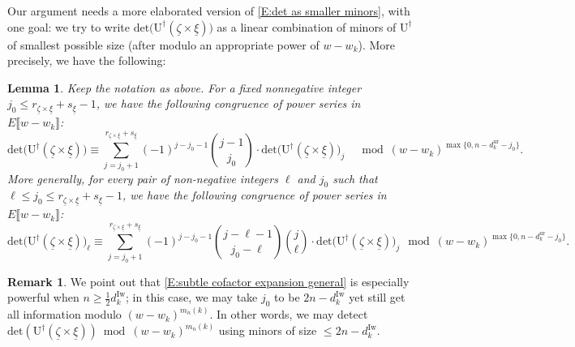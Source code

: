 \documentclass[12pt]{amsart}
\newtheorem{lemma}[subsection]{Lemma}
\theoremstyle{definition}
\newtheorem{remark}[subsection]{Remark}
\numberwithin{equation}{subsection}
\def\rmU{\mathrm{U}}
\newcommand{\Iw}{\mathrm{Iw}}
\renewcommand{\det}{\mathrm{det}}
\newcommand{\ur}{\mathrm{ur}}
\begin{document}
Our argument needs a more elaborated version of \eqref{E:det as smaller minors}, with one goal: we try to write $\det \big( \rmU^\dagger(\underline \zeta \times \underline \xi)\big)$ as a linear combination of minors of $\rmU^\dagger$ of   smallest possible size (after modulo an appropriate power of $w-w_k$). More precisely, we have the following:

\begin{lemma}
\label{L:subtle cofactor expansion}
Keep the notation as above. For a fixed nonnegative integer $j_0\leq r_{\underline \zeta \times \underline \xi} + s_{\underline \xi}-1$, we have the following congruence of power series in $E\llbracket w-w_k\rrbracket$:
\begin{equation}
\label{E:subtle cofactor expansion}
\det \big(\rmU^\dagger(\underline \zeta \times \underline \xi)\big) \equiv \sum_{j= j_0+1}^{r_{\underline \zeta \times \underline \xi} + s_{\underline \xi}} (-1)^{j-j_0-1} \binom{j-1}{j_0}\cdot \det \big(\rmU^\dagger(\underline \zeta \times \underline \xi)\big)_j \quad \bmod (w-w_k)^{\max\{0,n-d_k^\ur-j_0\}}.
\end{equation}
More generally, for every pair of non-negative integers $\ell$ and $j_0$ such that $\ell \leq j_0 \leq r_{\underline \zeta \times \underline \xi} + s_{\underline \xi}-1$, we have the following congruence of power series in $E\llbracket w-w_k\rrbracket$:
\begin{equation}
\label{E:subtle cofactor expansion general}
\det \big(\rmU^\dagger(\underline \zeta \times \underline \xi)\big)_{\ell} \equiv   \sum_{j= j_0+1}^{r_{\underline \zeta \times \underline \xi} + s_{\underline \xi}} (-1)^{j-j_0-1} \binom{j-\ell-1}{j_0-\ell} \binom{j}{\ell}\cdot \det \big(\rmU^\dagger(\underline \zeta \times \underline \xi)\big)_j \ \bmod (w-w_k)^{\max\{0,n-d_k^\ur-j_0\}}.
\end{equation}
\end{lemma}
\begin{remark}
We point out that \eqref{E:subtle cofactor expansion general} is especially powerful when $n \geq \frac 12d_k^\Iw$; in this case, we may take $j_0$ to be $2n-d_k^\Iw$ yet still get all information modulo $(w-w_k)^{m_n(k)}$. In other words, we may detect $\det(\rmU^\dagger(\underline \zeta\times \underline \xi))\bmod (w-w_k)^{m_n(k)}$ using minors of size $\leq 2n-d_k^\Iw$.
\end{remark}
\end{document}
